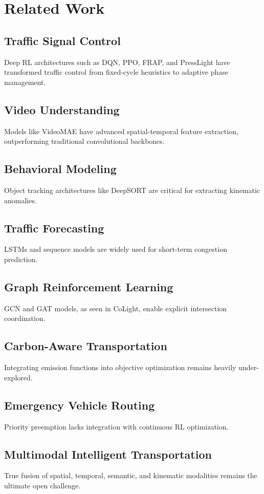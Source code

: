\documentclass{ieeeaccess}
\begin{document}
\section{Related Work}
\label{sec:related_work}
\subsection{Traffic Signal Control}
Deep RL architectures such as DQN, PPO, FRAP, and PressLight have transformed traffic control from fixed-cycle heuristics to adaptive phase management.
\subsection{Video Understanding}
Models like VideoMAE have advanced spatial-temporal feature extraction, outperforming traditional convolutional backbones.
\subsection{Behavioral Modeling}
Object tracking architectures like DeepSORT are critical for extracting kinematic anomalies.
\subsection{Traffic Forecasting}
LSTMs and sequence models are widely used for short-term congestion prediction.
\subsection{Graph Reinforcement Learning}
GCN and GAT models, as seen in CoLight, enable explicit intersection coordination.
\subsection{Carbon-Aware Transportation}
Integrating emission functions into objective optimization remains heavily under-explored.
\subsection{Emergency Vehicle Routing}
Priority preemption lacks integration with continuous RL optimization.
\subsection{Multimodal Intelligent Transportation}
True fusion of spatial, temporal, semantic, and kinematic modalities remains the ultimate open challenge.
\end{document}
